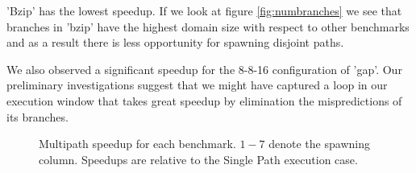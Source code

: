 \documentclass[10pt,dvips]{article}
\begin{document}
'Bzip' has the lowest speedup.  If we look at figure
\ref{fig:numbranches}  we see that branches in 'bzip' have
the highest domain size with respect to other benchmarks and
as a result there is less opportunity for spawning
disjoint paths.

We also observed a significant speedup for the 8-8-16 configuration
of 'gap'.  Our preliminary investigations suggest
that we might have captured 
a loop in our execution window that takes great speedup by elimination
the mispredictions of its branches.

\begin{figure}
\vspace{0.2 in}
\setlength{\epsfxsize}{14cm}%
\centerline{}
\caption{ Multipath speedup for each benchmark.  $1-7$ denote the
spawning column. 
Speedups are relative to the Single Path execution case.}
\label{fig:figall}
\end{figure}
%
%
%
%
%
%
\end{document}
